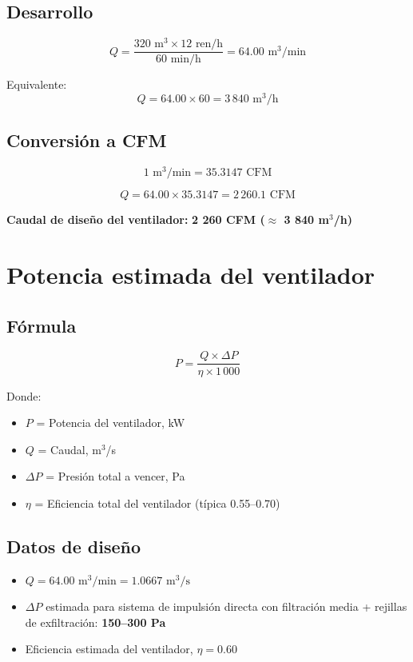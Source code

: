 \documentclass[12pt,a4paper]{article}
\begin{document}
\subsection{Desarrollo}

\[
Q = \frac{320 \text{ m}^3 \times 12 \text{ ren/h}}{60 \text{ min/h}} = 64.00 \text{ m}^3/\text{min}
\]

Equivalente:
\[
Q = 64.00 \times 60 = 3\,840 \text{ m}^3/\text{h}
\]

\subsection{Conversión a CFM}

\[
1 \text{ m}^3/\text{min} = 35.3147 \text{ CFM}
\]

\[
Q = 64.00 \times 35.3147 = 2\,260.1 \text{ CFM}
\]

\textbf{Caudal de diseño del ventilador:} \textbf{2 260 CFM ($\approx$ 3 840 m$^3$/h)}

\section{Potencia estimada del ventilador}

\subsection{Fórmula}

\[
P = \frac{Q \times \Delta P}{\eta \times 1\,000}
\]

Donde:
\begin{itemize}[leftmargin=*]
    \item $P$ = Potencia del ventilador, kW
    \item $Q$ = Caudal, m$^3$/s
    \item $\Delta P$ = Presión total a vencer, Pa
    \item $\eta$ = Eficiencia total del ventilador (típica 0.55--0.70)
\end{itemize}

\subsection{Datos de diseño}

\begin{itemize}[leftmargin=*]
    \item $Q = 64.00 \text{ m}^3/\text{min} = 1.0667 \text{ m}^3/\text{s}$
    \item $\Delta P$ estimada para sistema de impulsión directa con filtración media + rejillas de exfiltración: \textbf{150--300 Pa}
    \item Eficiencia estimada del ventilador, $\eta = 0.60$
\end{itemize}
\end{document}
